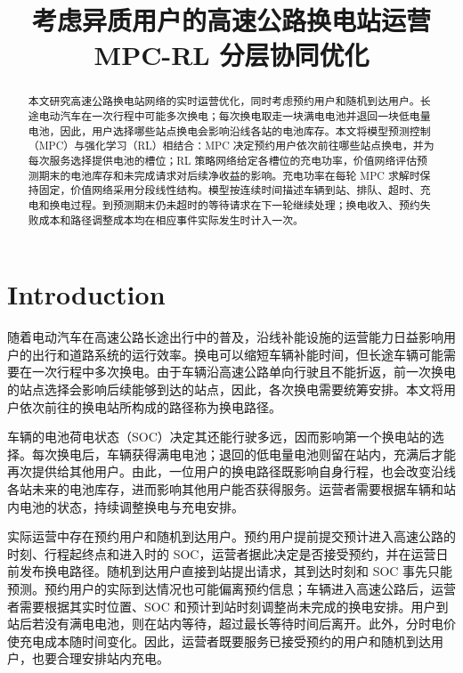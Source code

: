 \documentclass[12pt,a4paper,UTF8]{ctexart}
\begin{document}
\cover

\newpage
\begin{abstract}

本文研究高速公路换电站网络的实时运营优化，同时考虑预约用户和随机到达用户。长途电动汽车在一次行程中可能多次换电；每次换电取走一块满电电池并退回一块低电量电池，因此，用户选择哪些站点换电会影响沿线各站的电池库存。本文将模型预测控制（MPC）与强化学习（RL）相结合：MPC 决定预约用户依次前往哪些站点换电，并为每次服务选择提供电池的槽位；RL 策略网络给定各槽位的充电功率，价值网络评估预测期末的电池库存和未完成请求对后续净收益的影响。充电功率在每轮 MPC 求解时保持固定，价值网络采用分段线性结构。模型按连续时间描述车辆到站、排队、超时、充电和换电过程。到预测期末仍未超时的等待请求在下一轮继续处理；换电收入、预约失败成本和路径调整成本均在相应事件实际发生时计入一次。

\end{abstract}
\newpage

\thispagestyle{empty} %

\newpage
\tableofcontents

\newpage

\begin{center}
   \title{ \Huge \textbf{{考虑异质用户的高速公路换电站运营 MPC-RL 分层协同优化}}}
\end{center}


\section{Introduction}
随着电动汽车在高速公路长途出行中的普及，沿线补能设施的运营能力日益影响用户的出行和道路系统的运行效率。换电可以缩短车辆补能时间，但长途车辆可能需要在一次行程中多次换电。由于车辆沿高速公路单向行驶且不能折返，前一次换电的站点选择会影响后续能够到达的站点，因此，各次换电需要统筹安排。本文将用户依次前往的换电站所构成的路径称为换电路径。

车辆的电池荷电状态（SOC）决定其还能行驶多远，因而影响第一个换电站的选择。每次换电后，车辆获得满电电池；退回的低电量电池则留在站内，充满后才能再次提供给其他用户。由此，一位用户的换电路径既影响自身行程，也会改变沿线各站未来的电池库存，进而影响其他用户能否获得服务。运营者需要根据车辆和站内电池的状态，持续调整换电与充电安排。

实际运营中存在预约用户和随机到达用户。预约用户提前提交预计进入高速公路的时刻、行程起终点和进入时的 SOC，运营者据此决定是否接受预约，并在运营日前发布换电路径。随机到达用户直接到站提出请求，其到达时刻和 SOC 事先只能预测。预约用户的实际到达情况也可能偏离预约信息；车辆进入高速公路后，运营者需要根据其实时位置、SOC 和预计到站时刻调整尚未完成的换电安排。用户到站后若没有满电电池，则在站内等待，超过最长等待时间后离开。此外，分时电价使充电成本随时间变化。因此，运营者既要服务已接受预约的用户和随机到达用户，也要合理安排站内充电。
\end{document}

